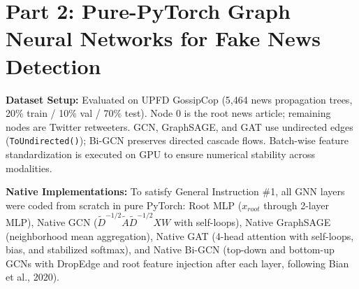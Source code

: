 \documentclass[12pt,a4paper]{article}
\begin{document}
\section{Part 2: Pure-PyTorch Graph Neural Networks for Fake News Detection}
\textbf{Dataset Setup:} Evaluated on UPFD GossipCop (5,464 news propagation trees, 20\% train / 10\% val / 70\% test). Node 0 is the root news article; remaining nodes are Twitter retweeters. GCN, GraphSAGE, and GAT use undirected edges (\texttt{ToUndirected()}); Bi-GCN preserves directed cascade flows. Batch-wise feature standardization is executed on GPU to ensure numerical stability across modalities.

\noindent\textbf{Native Implementations:} To satisfy General Instruction \#1, all GNN layers were coded from scratch in pure PyTorch: Root MLP ($x_{root}$ through 2-layer MLP), Native GCN ($\tilde{D}^{-1/2}\tilde{A}\tilde{D}^{-1/2}XW$ with self-loops), Native GraphSAGE (neighborhood mean aggregation), Native GAT (4-head attention with self-loops, bias, and stabilized softmax), and Native Bi-GCN (top-down and bottom-up GCNs with DropEdge and root feature injection after each layer, following Bian et al., 2020).
\end{document}

